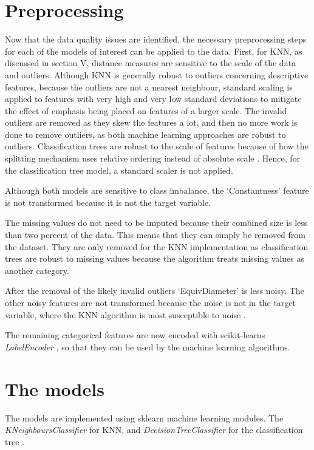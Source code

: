 \documentclass[conference]{IEEEtran}
\begin{document}
\section{Preprocessing}
Now that the data quality issues are identified, the necessary preprocessing steps for each of the models of interest can be applied to the data.
First, for KNN, as discussed in section V, distance measures are sensitive to the scale of the data and outliers. Although KNN is generally robust to outliers concerning descriptive features,
because the outliers are not a nearest neighbour, standard scaling is applied to features with very high and very low standard deviations to mitigate the effect of emphasis being placed on features of a larger scale.
The invalid outliers are removed as they skew the features a lot, and then no more work is done to remove outliers, as both machine learning approaches are robust to outliers. Classification trees are robust to the scale of features because
of how the splitting mechanism uses relative ordering instead of absolute scale \cite{fund}. Hence, for the classification tree model, a standard scaler is not applied.

Although both models are sensitive to class imbalance, the `Constantness' feature is not transformed because it is not the target variable.

The missing values do not need to be imputed because their combined size is less than two percent of the data. This means that they can simply be removed from
the dataset. They are only removed for the KNN implementation as classification trees are robust to missing values because the algorithm treats missing values as
another category.

After the removal of the likely invalid outliers `EquivDiameter' is less noisy.
The other noisy features are not transformed because the noise is not in the target variable, where the KNN algorithm is most susceptible to noise \cite{fund}.

The remaining categorical features are now encoded with scikit-learns \emph{LabelEncoder} \cite{sk}, so that they can be used by the machine learning algorithms.

\section{The models}
The models are implemented using sklearn machine learning modules. The \emph{KNeighboursClassifier} for KNN, and
\emph{DecisionTreeClassifier} for the classification tree \cite{sk}.
\end{document}
